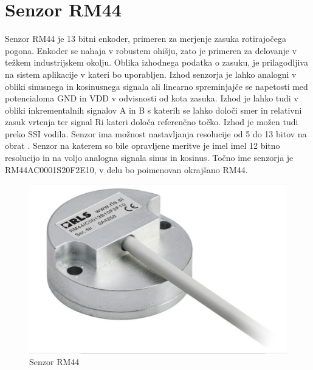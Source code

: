 \chapter{Senzor RM44}
Senzor RM44 je 13 bitni enkoder, primeren za merjenje zasuka rotirajočega pogona\cite{RM44}.
Enkoder se nahaja v robustem ohišju, zato je primeren za delovanje v težkem industrijskem okolju. %
Oblika izhodnega podatka o zasuku, je prilagodljiva na sistem aplikacije v kateri bo uporabljen\cite{Ambrozic}. Izhod senzorja je lahko analogni v obliki sinusnega in kosinusnega signala ali linearno spreminjajče
se napetosti med potencialoma GND in VDD v odvisnosti od kota zasuka.
Izhod je lahko tudi v obliki inkrementalnih signalov A in B s katerih se lahko določi smer in relativni zasuk vrtenja ter signal Ri kateri določa referenčno točko. Izhod je možen tudi preko SSI vodila. Senzor ima
možnost nastavljanja resolucije od 5 do 13 bitov na obrat \cite{AM8192}\cite{RM44}. Senzor na katerem so bile opravljene meritve je imel imel 12 bitno resolucijo in na voljo analogna signala sinus in kosinus. Točno ime senzorja je
RM44AC0001S20F2E10, v delu bo poimenovan okrajšano RM44.
\begin{figure}[h]
	\centering
	\includegraphics[width=0.6\columnwidth]{./Slike/senzorRM44.jpg}
	\caption{Senzor RM44}
	\label{RM44}
\end{figure}


